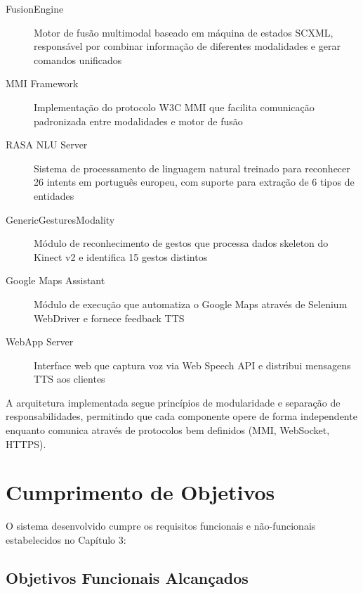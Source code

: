 \begin{description}
    \item[FusionEngine] Motor de fusão multimodal baseado em máquina de estados SCXML, responsável por combinar informação de diferentes modalidades e gerar comandos unificados

    \item[MMI Framework] Implementação do protocolo W3C MMI que facilita comunicação padronizada entre modalidades e motor de fusão

    \item[RASA NLU Server] Sistema de processamento de linguagem natural treinado para reconhecer 26 intents em português europeu, com suporte para extração de 6 tipos de entidades

    \item[GenericGesturesModality] Módulo de reconhecimento de gestos que processa dados skeleton do Kinect v2 e identifica 15 gestos distintos

    \item[Google Maps Assistant] Módulo de execução que automatiza o Google Maps através de Selenium WebDriver e fornece feedback TTS

    \item[WebApp Server] Interface web que captura voz via Web Speech API e distribui mensagens TTS aos clientes
\end{description}

A arquitetura implementada segue princípios de modularidade e separação de responsabilidades, permitindo que cada componente opere de forma independente enquanto comunica através de protocolos bem definidos (MMI, WebSocket, HTTPS).

\section{Cumprimento de Objetivos}

O sistema desenvolvido cumpre os requisitos funcionais e não-funcionais estabelecidos no Capítulo 3:

\subsection{Objetivos Funcionais Alcançados}

